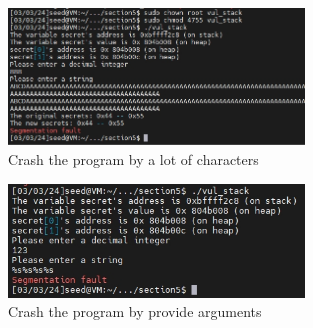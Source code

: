 \documentclass[a4paper,11pt]{article}
\begin{document}
\begin{figure}[h]
    \centering
       \includegraphics[width=0.7\textwidth]{figures/task22/task22-1.png}
    \caption{Crash the program by a lot of characters}\label{fig:task22-1}
\end{figure}
\begin{figure}[h]
    \centering
       \includegraphics[width=0.7\textwidth]{figures/task22/task22-2.png}
    \caption{Crash the program by provide arguments}\label{fig:task22-2}
\end{figure}
\end{document}
